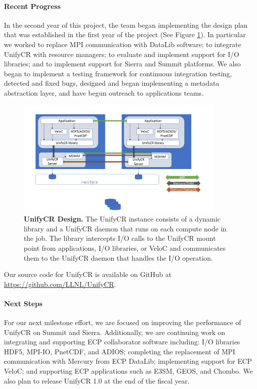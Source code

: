 \paragraph{Recent Progress}

In the second year of this project, the team began
implementing the design plan that was established in the first
year of the project (See Figure \ref{fig:milestone2}). In particular
we worked to replace MPI communication with DataLib software; to integrate
UnifyCR with resource managers; to evaluate and implement support for I/O 
libraries; and to implement support for Sierra and Summit platforms.
We also began to implement a testing framework for continuous integration
testing, detected and fixed bugs, designed and began implementing a 
metadata abstraction layer, and have begun outreach to applications teams.
\begin{figure}[htb]
        \centering
        \includegraphics[width=4in]{projects/2.3.4-DataViz/2.3.4.15-HDF5-UnifyCR/milestone2}
        \caption{\label{fig:milestone2} \textbf{UnifyCR Design.} The UnifyCR
instance consists of a dynamic library and a UnifyCR daemon that runs
on each compute node in the job. The library intercepts I/O calls to
the UnifyCR mount point from applications, I/O libraries, or VeloC and communicates them to the UnifyCR daemon that handles the I/O operation.}
\end{figure}


Our source code for UnifyCR is available on 
GitHub at \url{https://github.com/LLNL/UnifyCR}. 
\paragraph{Next Steps}

For our next milestone effort, we are focused on improving the performance
of UnifyCR on Summit and Sierra. Additionally, we are continuing work on 
integrating and supporting ECP collaborator software including:
I/O libraries HDF5, MPI-IO, PnetCDF, and ADIOS; completing the replacement
of MPI communication with Mercury from ECP DataLib; implementing
support for ECP VeloC; and supporting ECP applications such as
E3SM, GEOS, and Chombo.
We also plan to release UnifyCR 1.0 at the end of the fiscal year.

